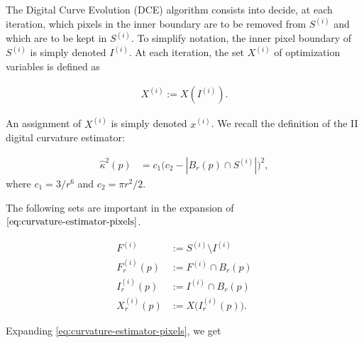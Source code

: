 The Digital Curve Evolution (DCE) algorithm consists into decide, at each iteration, which pixels in the inner boundary are to be removed from $S^{(i)}$ and which are to be kept in $S^{(i)}$. To simplify notation, the inner pixel boundary of $S^{(i)}$ is simply denoted $I^{(i)}$. At each iteration, the set $X^{(i)}$ of optimization variables is defined as

\begin{align*}
	X^{(i)} := X(I^{(i)}).
\end{align*}

An assignment of $X^{(i)}$ is simply denoted $x^{(i)}$. We recall the definition of the II digital curvature estimator:

\begin{align}
	\hat{\kappa}^2(p) &= c_1\Big( c_2 - | B_r(p) \cap S^{(i)} | \Big)^2, 
	\label{eq:curvature-estimator-pixels}
\end{align}
where $c_1=3/r^6$ and $c_2=\pi r^2/2$. 

The following sets are important in the expansion of $\eqref{eq:curvature-estimator-pixels}$.


\begin{align*}
	F^{(i)} &:= S^{(i)} \setminus I^{(i)} \\
	F_r^{(i)}(p) &:= F^{(i)} \cap B_r(p)\\
	I_r^{(i)}(p) &:= I^{(i)} \cap B_r(p) \\
	X_r^{(i)}(p) &:= X\big( I_r^{(i)}(p) \big).
\end{align*}


Expanding \eqref{eq:curvature-estimator-pixels}, we get 

